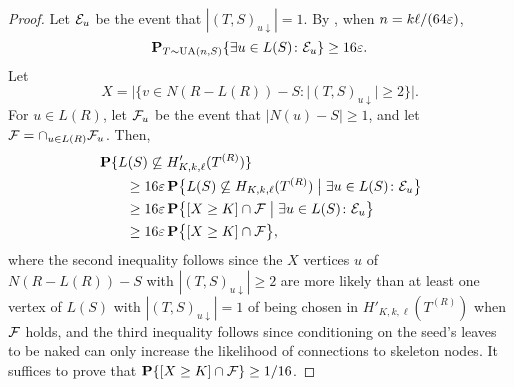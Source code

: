 \begin{proof}
  Let $\mathcal{E}_u$ be the event that $|(T, S)_{u \downarrow}| = 1$. By
  , when $n = k \ell/(64\varepsilon)$,
  \[
    \operatorname{\mathbf{P}}_{T \sim \operatorname{UA}(n, S)}\{ \exists u \in L(S) \colon \mathcal{E}_u\} \ge 16 \varepsilon .
  \]
  Let
  \[
    X = |\{v \in N(R - L(R)) - S \colon |(T, S)_{u \downarrow}| \ge 2\}| .
  \]
  For $u \in L(R)$, let $\mathcal{F}_u$ be the event that $|N(u) - S| \ge 1$,
  and let $\mathcal{F} = \cap_{u \in L(R)} \mathcal{F}_u$. Then,
  \begin{align*}
    &\operatorname{\mathbf{P}}\{L(S) \not\subseteq H'_{K, k, \ell}(T^{(R)})\} \\
    &\qquad \ge 16 \varepsilon \operatorname{\mathbf{P}}\bigl\{L(S) \not\subseteq H_{K, k, \ell}(T^{(R)}) \mathrel{\bigm|} \exists u \in L(S) \colon \mathcal{E}_u\bigr\} \\
    &\qquad \ge 16 \varepsilon \operatorname{\mathbf{P}}\bigl\{[X \ge K] \cap \mathcal{F} \mathrel{\bigm|} \exists u \in L(S) \colon \mathcal{E}_u\bigr\} \\
    &\qquad \ge 16 \varepsilon \operatorname{\mathbf{P}}\bigl\{[X \ge K] \cap \mathcal{F} \bigr\} ,
  \end{align*}
  where the second inequality follows since the $X$ vertices $u$ of
  $N(R - L(R)) - S$ with $|(T, S)_{u \downarrow}| \ge 2$ are more
  likely than at least one vertex of $L(S)$ with
  $|(T, S)_{u \downarrow}| = 1$ of being chosen in
  $H'_{K, k, \ell}(T^{(R)})$ when $\mathcal{F}$ holds, and the third
  inequality follows since conditioning on the seed's leaves to be
  naked can only increase the likelihood of connections to skeleton
  nodes. It suffices to prove that $\operatorname{\mathbf{P}}\{[X \ge K] \cap \mathcal{F}\} \ge 1/16$.


\end{proof}
